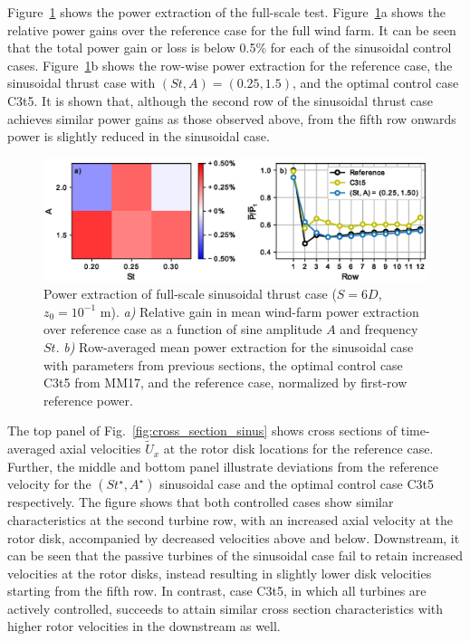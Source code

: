 \documentclass[wes, manuscript]{copernicus}
\begin{document}
Figure~\ref{fig:sinus_fullscale} shows the power extraction of the full-scale test. Figure~\ref{fig:sinus_fullscale}a shows the relative power gains over the reference case for the full wind farm. It can be seen that the total power gain or loss is below 0.5\% for each of the sinusoidal control cases. Figure~\ref{fig:sinus_fullscale}b shows the row-wise power extraction for the reference case, the sinusoidal thrust case with $(St, A) = (0.25, 1.5)$, and the optimal control case C3t5. It is shown that, although the second row of the sinusoidal thrust case achieves similar power gains as those observed above, from the fifth row onwards power is slightly reduced in the sinusoidal case.

\begin{figure}
	\centering
	\includegraphics[width=\textwidth]{figure19}
	\caption{Power extraction of full-scale sinusoidal thrust case ($S = 6D$, $z_0 = 10^{-1}$ m). \emph{a) } Relative gain in mean wind-farm power extraction over reference case as a function of sine amplitude $A$ and frequency $St$. \emph{b) } Row-averaged mean power extraction for the sinusoidal case with parameters from previous sections, the optimal control case C3t5 from MM17, and the reference case, normalized by first-row reference power.\label{fig:sinus_fullscale} }
\end{figure}

The top panel of Fig.~\ref{fig:cross_section_sinus} shows cross sections of time-averaged axial velocities $\widetilde{U}_x$ at the rotor disk locations for the reference case. Further, the middle and bottom panel illustrate deviations from the reference velocity for the $(St^\star, A^\star)$ sinusoidal case and the optimal control case C3t5 respectively.  The figure shows that both controlled cases show similar characteristics at the second turbine row, with an increased axial velocity at the rotor disk, accompanied by decreased velocities above and below. Downstream, it can be seen that the passive turbines of the sinusoidal case fail to retain increased velocities at the rotor disks, instead resulting in slightly lower disk velocities starting from the fifth row. In contrast, case C3t5, in which all turbines are actively controlled, succeeds to attain similar cross section characteristics with higher rotor velocities in the downstream as well. 
\end{document}
